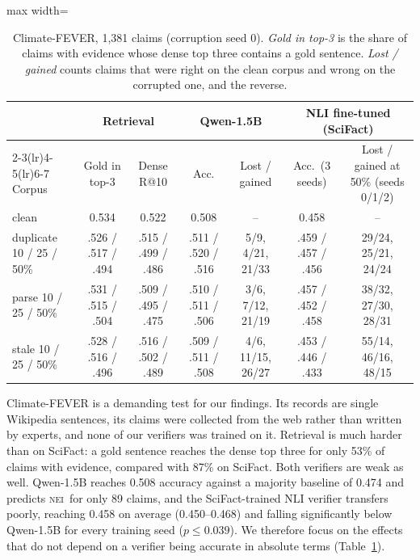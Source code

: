 \documentclass[11pt]{article}
\newcommand{\Nei}{\textsc{nei}}
\begin{document}
\begin{table}[t]
\centering\small
\setlength\tabcolsep{5pt}
\begin{adjustbox}{max width=\textwidth}
\begin{tabular}{lcccccc}
\toprule
& \multicolumn{2}{c}{Retrieval} & \multicolumn{2}{c}{Qwen-1.5B} & \multicolumn{2}{c}{NLI fine-tuned (SciFact)} \\
\cmidrule(lr){2-3}\cmidrule(lr){4-5}\cmidrule(lr){6-7}
Corpus & Gold in top-3 & Dense R@10 & Acc. & Lost / gained & Acc.\ (3 seeds) & Lost / gained at 50\% (seeds 0/1/2) \\
\midrule
clean & 0.534 & 0.522 & 0.508 & -- & 0.458 & -- \\
duplicate 10 / 25 / 50\% & .526 / .517 / .494 & .515 / .499 / .486 & .511 / .520 / .516 & 5/9, 4/21, 21/33 & .459 / .457 / .456 & 29/24, 25/21, 24/24 \\
parse 10 / 25 / 50\% & .531 / .515 / .504 & .509 / .495 / .475 & .510 / .511 / .506 & 3/6, 7/12, 21/19 & .457 / .452 / .458 & 38/32, 27/30, 28/31 \\
stale 10 / 25 / 50\% & .528 / .516 / .496 & .516 / .502 / .489 & .509 / .511 / .508 & 4/6, 11/15, 26/27 & .453 / .446 / .433 & 55/14, 46/16, 48/15 \\
\bottomrule
\end{tabular}
\end{adjustbox}
\caption{Climate-FEVER, 1,381 claims (corruption seed 0). \emph{Gold in top-3} is the share of claims with
evidence whose dense top three contains a gold sentence. \emph{Lost / gained} counts claims that were right
on the clean corpus and wrong on the corrupted one, and the reverse.}
\label{tab:climate}
\end{table}

Climate-FEVER is a demanding test for our findings. Its records are single Wikipedia sentences, its claims
were collected from the web rather than written by experts, and none of our verifiers was trained on it.
Retrieval is much harder than on SciFact: a gold sentence reaches the dense top three for only 53\% of
claims with evidence, compared with 87\% on SciFact. Both verifiers are weak as well. Qwen-1.5B reaches
0.508 accuracy against a majority baseline of 0.474 and predicts \Nei\ for only 89 claims, and the
SciFact-trained NLI verifier transfers poorly, reaching 0.458 on average (0.450--0.468) and falling
significantly below Qwen-1.5B for every training seed ($p \le 0.039$). We therefore focus on the effects
that do not depend on a verifier being accurate in absolute terms (Table~\ref{tab:climate}).
\end{document}
